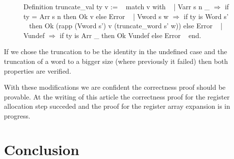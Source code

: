 \documentclass{article}
\begin{document}
\begin{figure}[t]
\obeylines\obeyspaces\ttfamily%
Definition truncate\_val ty v :=
~ match v with
~ | Varr s n \_ \(\Rightarrow\) if ty = Arr s n then Ok v else Error
~ | Vword s w \(\Rightarrow\) if ty is Word s'
~   then Ok (rapp (Vword s') v (truncate\_word s' w)) else Error
~ | Vundef \(\Rightarrow\) if ty is Arr \_ then Ok Vundef else Error
~ end.
\normalfont%
\end{figure}

If we chose the truncation to be the identity in the undefined case and the
truncation of a word to a bigger size (where previously it failed) then both
properties are verified.

\medskip

With these modifications we are confident the correctness proof should be
provable. At the writing of this article the correctness proof for the register
allocation step succeded and the proof for the register array expansion is in
progress.

\section{Conclusion}\label{sec:ccl}
\end{document}
